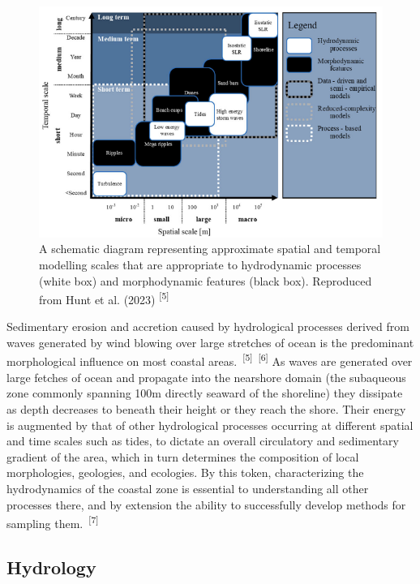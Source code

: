 \documentclass{article}
\begin{document}
\begin{figure}
    \centering
    \includegraphics[width=0.8\linewidth]{images/spatial-and-temporal.png}
    \caption{A schematic diagram representing approximate spatial and temporal modelling scales that are appropriate to hydrodynamic processes (white box) and morphodynamic features (black box). Reproduced from Hunt et al. (2023) \textsuperscript{[5]}}
    \label{figure1}
\end{figure}

\par{Sedimentary erosion and accretion caused by hydrological processes derived from waves generated by wind blowing over large stretches of ocean is the predominant morphological influence on most coastal areas.~\textsuperscript{[5]}~\textsuperscript{[6]} As waves are generated over large fetches of ocean and propagate into the nearshore domain (the subaqueous zone commonly spanning 100m directly seaward of the shoreline) they dissipate as depth decreases to beneath their height or they reach the shore. Their energy is augmented by that of other hydrological processes occurring at different spatial and time scales such as tides, to dictate an overall circulatory and sedimentary gradient of the area, which in turn determines the composition of local morphologies, geologies, and ecologies. By this token, characterizing the hydrodynamics of the coastal zone is essential to understanding all other processes there, and by extension the ability to successfully develop methods for sampling them.~\textsuperscript{[7]}}

\subsection{Hydrology}
\end{document}
